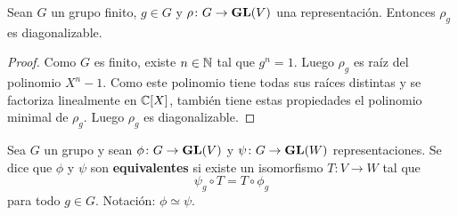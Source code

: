 
%

\begin{proposition}
  Sean $G$ un grupo finito, $g\in G$ y $\rho\colon G\to\mathbf{GL}(V)$ una representación. Entonces
  $\rho_g$ es diagonalizable. 
\end{proposition}

\begin{proof}
  Como $G$ es finito, existe $n\in\mathbb{N}$ tal que $g^n=1$. Luego $\rho_g$ es raíz
  del polinomio $X^n-1$. Como este polinomio tiene todas sus raíces distintas y
  se factoriza linealmente en $\mathbb{C}[X]$, también tiene estas propiedades el
  polinomio minimal de $\rho_g$. Luego $\rho_g$ es diagonalizable.
\end{proof}

\begin{definition}
Sea $G$ un grupo y sean $\phi\colon G\to\mathbf{GL}(V)$ y $\psi\colon G\to\mathbf{GL}(W)$ 
representaciones. Se dice que $\phi$ y $\psi$ son \textbf{equivalentes} si
existe un isomorfismo $T\colon V\to W$ tal que 
\[
	\psi_g\circ T=T\circ \phi_g
\]
para todo $g\in G$. Notación: $\phi\simeq\psi$. 
\end{definition}

